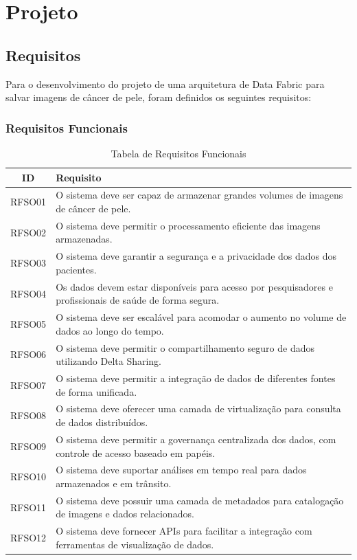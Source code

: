 
\chapter[Projeto]{Projeto}

\section{Requisitos}

Para o desenvolvimento do projeto de uma arquitetura de Data Fabric para salvar imagens de câncer de pele, foram definidos os seguintes requisitos:

\subsection{Requisitos Funcionais}
\begin{table}[H]
    \centering
    \begin{tabular}{|c|p{12cm}|}
    \hline
    \textbf{ID} & \textbf{Requisito} \\ \hline
    RFSO01 & O sistema deve ser capaz de armazenar grandes volumes de imagens de câncer de pele. \\ \hline
    RFSO02 & O sistema deve permitir o processamento eficiente das imagens armazenadas. \\ \hline
    RFSO03 & O sistema deve garantir a segurança e a privacidade dos dados dos pacientes. \\ \hline
    RFSO04 & Os dados devem estar disponíveis para acesso por pesquisadores e profissionais de saúde de forma segura. \\ \hline
    RFSO05 & O sistema deve ser escalável para acomodar o aumento no volume de dados ao longo do tempo. \\ \hline
    RFSO06 & O sistema deve permitir o compartilhamento seguro de dados utilizando Delta Sharing. \\ \hline
    RFSO07 & O sistema deve permitir a integração de dados de diferentes fontes de forma unificada. \\ \hline
    RFSO08 & O sistema deve oferecer uma camada de virtualização para consulta de dados distribuídos. \\ \hline
    RFSO09 & O sistema deve permitir a governança centralizada dos dados, com controle de acesso baseado em papéis. \\ \hline
    RFSO10 & O sistema deve suportar análises em tempo real para dados armazenados e em trânsito. \\ \hline
    RFSO11 & O sistema deve possuir uma camada de metadados para catalogação de imagens e dados relacionados. \\ \hline
    RFSO12 & O sistema deve fornecer APIs para facilitar a integração com ferramentas de visualização de dados. \\ \hline
    \end{tabular}
    \caption{Tabela de Requisitos Funcionais}
    \label{tab:requisitos_funcionais}
\end{table}

